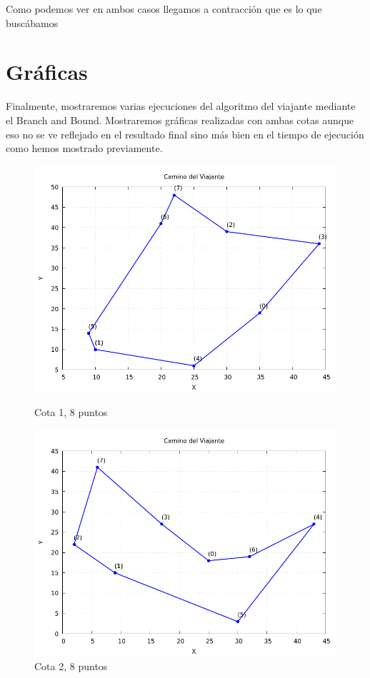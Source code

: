 \documentclass[11pt,openany]{book}
\begin{document}
Como podemos ver en ambos casos llegamos a contracción que es lo que buscábamos

\newpage

\section{Gráficas}
Finalmente, mostraremos varias ejecuciones del algoritmo del viajante mediante el Branch and Bound. Mostraremos gráficas realizadas con ambas
cotas aunque eso no se ve reflejado en el resultado final sino más bien en el tiempo de ejecución como hemos mostrado previamente.

\begin{figure}[H]
      \centering
      \begin{minipage}{.48\textwidth}
            \centering
            \includegraphics[width=1\linewidth]{assets/Img/Cota_1_BB/grafico_8_1.png}
            \caption{Cota 1, 8 puntos}
            \label{fig:Cota 1}
      \end{minipage}%
      \begin{minipage}{.48\textwidth}
            \centering
            \includegraphics[width=1\linewidth]{assets/Img/Cota_2_BB/grafico_8_1.png}
            \caption{Cota 2, 8 puntos}
            \label{fig:Cota 2}
      \end{minipage}
\end{figure}
\end{document}
